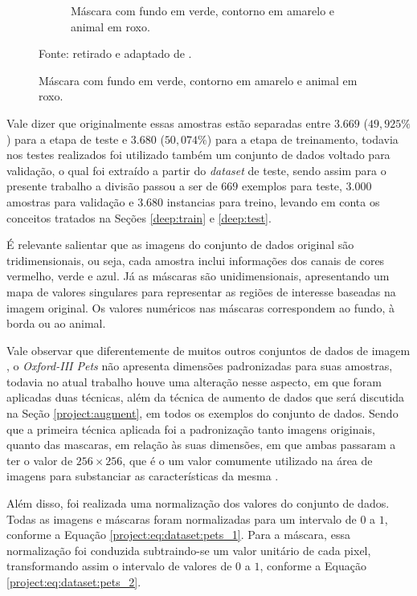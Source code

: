 \begin{figure}[H]
\begin{subfigure}[t]{0.5\textwidth}
        \caption{Máscara com fundo em verde, contorno em amarelo e animal em roxo.}
        \label{project:fig:dataset:pets_1.2}
    \end{subfigure}%

    Fonte: retirado e adaptado de \cite{Parkhi2012CatsDogs}.
\end{figure}

Vale dizer que originalmente essas amostras estão separadas entre $3.669$ ($49,925\%$) para a etapa de teste e $3.680$ ($50,074\%$) para a etapa de treinamento, todavia nos testes realizados foi utilizado também um conjunto de dados voltado para validação, o qual foi extraído a partir do \textit{dataset} de teste, sendo assim para o presente trabalho a divisão passou a ser de $669$ exemplos para teste, 3.000 amostras para validação e 3.680 instancias para treino, levando em conta os conceitos tratados na Seções \ref{deep:train} e \ref{deep:test}.

É relevante salientar que as imagens do conjunto de dados original são tridimensionais, ou seja, cada amostra inclui informações dos canais de cores vermelho, verde e azul. Já as máscaras são unidimensionais, apresentando um mapa de valores singulares para representar as regiões de interesse baseadas na imagem original. Os valores numéricos nas máscaras correspondem ao fundo, à borda ou ao animal.

Vale observar que diferentemente de muitos outros conjuntos de dados de imagem \citep{Bossard2014Food-101Forests}, o \textit{Oxford-III Pets} não apresenta dimensões padronizadas para suas amostras, todavia no atual trabalho houve uma alteração nesse aspecto, em que foram aplicadas duas técnicas, além da técnica de aumento de dados que será discutida na Seção \ref{project:augment}, em todos os exemplos do conjunto de dados. Sendo que a primeira técnica aplicada foi a padronização tanto imagens originais, quanto das mascaras, em relação às suas dimensões, em que ambas passaram a ter o valor de $256 \times 256$, que é o um valor comumente utilizado na área de imagens para substanciar as características da mesma \citep{Lee1983DigitalFilter}.

Além disso, foi realizada uma normalização dos valores do conjunto de dados. Todas as imagens e máscaras foram normalizadas para um intervalo de $0$ a $1$, conforme a Equação \ref{project:eq:dataset:pets_1}. Para a máscara, essa normalização foi conduzida subtraindo-se um valor unitário de cada pixel, transformando assim o intervalo de valores de $0$ a $1$, conforme a Equação \ref{project:eq:dataset:pets_2}.

